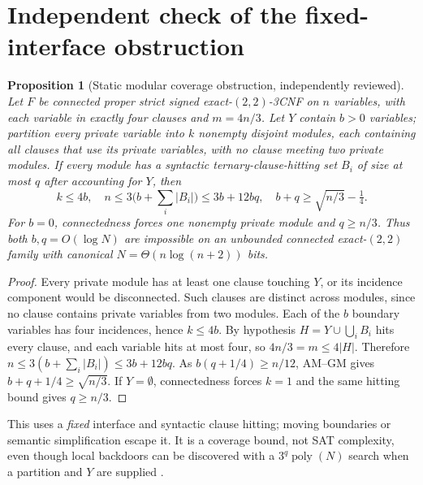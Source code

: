 \documentclass[11pt]{article}
\newtheorem{proposition}[theorem]{Proposition}
\begin{document}
\section{Independent check of the fixed-interface obstruction}
\begin{proposition}[Static modular coverage obstruction, independently reviewed]
Let $F$ be connected proper strict signed exact-$(2,2)$-3CNF on $n$ variables, with each variable in exactly four clauses and $m=4n/3$. Let $Y$ contain $b>0$ variables; partition every private variable into $k$ nonempty disjoint modules, each containing all clauses that use its private variables, with no clause meeting two private modules. If every module has a syntactic ternary-clause-hitting set $B_i$ of size at most $q$ after accounting for $Y$, then
\[
 k\le4b,\quad n\le3\bigl(b+\sum_i|B_i|\bigr)\le3b+12bq,
 \quad b+q\ge\sqrt{n/3}-\tfrac14.
\]
For $b=0$, connectedness forces one nonempty private module and $q\ge n/3$. Thus both $b,q=O(\log N)$ are impossible on an unbounded connected exact-$(2,2)$ family with canonical $N=\Theta(n\log(n+2))$ bits.
\end{proposition}
\begin{proof}
Every private module has at least one clause touching $Y$, or its incidence component would be disconnected. Such clauses are distinct across modules, since no clause contains private variables from two modules. Each of the $b$ boundary variables has four incidences, hence $k\le4b$. By hypothesis $H=Y\cup\bigcup_iB_i$ hits every clause, and each variable hits at most four, so $4n/3=m\le4|H|$. Therefore $n\le3(b+\sum_i|B_i|)\le3b+12bq$. As $b(q+1/4)\ge n/12$, AM--GM gives $b+q+1/4\ge\sqrt{n/3}$. If $Y=\emptyset$, connectedness forces $k=1$ and the same hitting bound gives $q\ge n/3$.
\end{proof}
This uses a \emph{fixed} interface and syntactic clause hitting; moving boundaries or semantic simplification escape it. It is a coverage bound, not SAT complexity, even though local backdoors can be discovered with a $3^q\operatorname{poly}(N)$ search when a partition and $Y$ are supplied \cite{nrs2004}.
\end{document}
